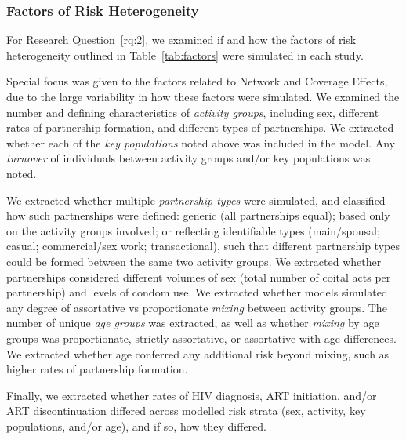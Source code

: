 \subsubsection{Factors of Risk Heterogeneity}
\label{sss:meth:factors}
For Research Question~\ref{rq:2}, we examined if and how
the factors of risk heterogeneity outlined in Table~\ref{tab:factors}
were simulated in each study.
\par
Special focus was given to the factors related to Network and Coverage Effects,
due to the large variability in how these factors were simulated.
We examined the number and defining characteristics of
\emph{activity groups}, including
sex, different rates of partnership formation, and different types of partnerships.
We extracted whether each of the \emph{key populations} noted above was included in the model.
Any \emph{turnover} of individuals between activity groups and/or key populations was noted.
\par
We extracted whether multiple \emph{partnership types} were simulated,
and classified how such partnerships were defined:
generic (all partnerships equal);
based only on the activity groups involved;
or reflecting identifiable types (main/spousal; casual; commercial/sex work; transactional),
such that different partnership types could be formed between the same two activity groups.
We extracted whether partnerships considered different
volumes of sex (total number of coital acts per partnership) and levels of condom use.
We extracted whether models simulated any degree of assortative vs proportionate
\emph{mixing} between activity groups.
The number of unique \emph{age groups} was extracted, as well as
whether \emph{mixing} by age groups was
proportionate, strictly assortative, or assortative with age differences.
We extracted whether age conferred any additional risk beyond mixing,
such as higher rates of partnership formation.
\par
Finally, we extracted whether rates of HIV diagnosis, ART initiation, and/or ART discontinuation
differed across modelled risk strata (sex, activity, key populations, and/or age),
and if so, how they differed.
